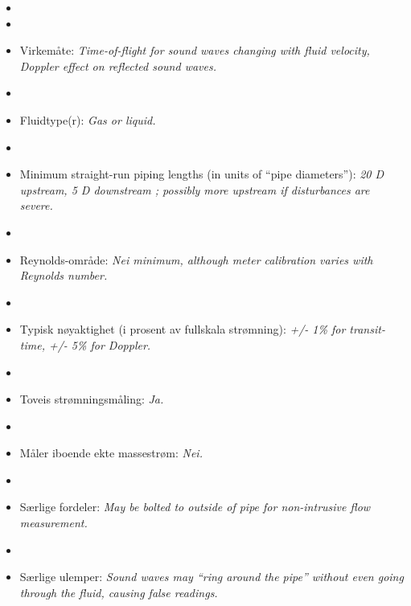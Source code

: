 \begin{itemize}
\goodbreak
\item{} 
\vskip 5pt
\item\item{} Virkemåte: {\it Time-of-flight for sound waves changing with fluid velocity, Doppler effect on reflected sound waves.}
\vskip 5pt
\item\item{} Fluidtype(r): {\it Gas or liquid.}
\vskip 5pt
\item\item{} Minimum straight-run piping lengths (in units of ``pipe diameters''): {\it 20 D upstream, 5 D downstream ; possibly more upstream if disturbances are severe.}
\vskip 5pt
\item\item{} Reynolds-område: {\it Nei minimum, although meter calibration varies with Reynolds number.}
\vskip 5pt
\item\item{} Typisk nøyaktighet (i prosent av fullskala strømning): {\it +/- 1\% for transit-time, +/- 5\% for Doppler.}
\vskip 5pt
\item\item{} Toveis strømningsmåling: {\it Ja.}
\vskip 5pt
\item\item{} Måler iboende ekte massestrøm: {\it Nei.}
\vskip 5pt
\item\item{} Særlige fordeler: {\it May be bolted to outside of pipe for non-intrusive flow measurement.}
\vskip 5pt
\item\item{} Særlige ulemper: {\it Sound waves may ``ring around the pipe'' without even going through the fluid, causing false readings.}
\end{itemize}

